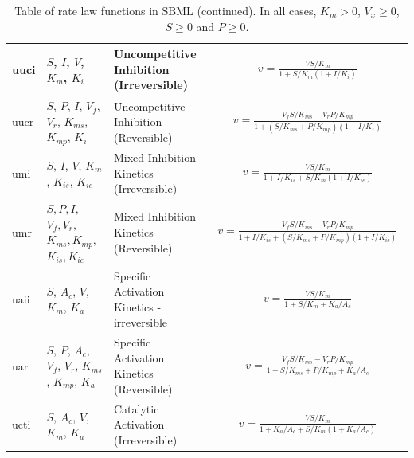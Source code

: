 \documentclass[10pt]{cekarticle}
\newcommand{\changed}[1]{\textcolor{BrickRed}{#1}}
\begin{document}
\begin{table}[ht]
\begin{tabular}{|p{0.5in}|>{\raggedright}m{0.77in}|>{\raggedright}m{1.5in}|m{3.1in}|}
uuci & $S$, $I$, $V$, $K_m$, $K_i$ & Uncompetitive Inhibition
(Irreversible) &
\begin{gather*}
v = \frac{V S/K_m}{1 + S/K_m \left( 1 + I/K_i\right)}
\end{gather*}
\\ \hline

uucr & $S$, $P$, $I$, $V_f$, $V_r$, $K_{ms}$, $K_{mp}$, $K_i$ &
Uncompetitive Inhibition (Reversible) &
\begin{gather*}
v = \frac{V_f S/K_{ms} - V_r
P/K_{mp}}{1 + \left( S/K_{ms} + P/K_{mp} \right) \left( 1 + I/K_i\right) }
\end{gather*}
\\ \hline

umi & $S$, $I$, $V$, $K_m$, $K_{is}$, $K_{ic}$ & Mixed Inhibition
Kinetics (Irreversible) &
\begin{gather*}
v = \frac{V S/K_m}{1 + I/K_{is} + S/K_m \left( 1 + I/K_{ic} \right) }
\end{gather*}
\\ \hline

umr & $ S, P, I,$ $ V_f, V_r, $ $ K_{ms}, K_{mp}, $ $ K_{is}, K_{ic} $ & Mixed
Inhibition Kinetics (Reversible) &
\begin{gather*}
v = \frac{V_f S/K_{ms} - V_r
P/K_{mp}}{1 + I/K_{is} + \left( S/K_{ms} + P/K_{mp} \right) \left( 1 + I/K_{ic}
\right) }
\end{gather*}
\\ \hline

\changed{uaii} & $S$, $A_c$, $V$, $K_m$, $K_a$ & Specific Activation Kinetics -
irreversible &
\begin{gather*}
v = \frac{V S/K_m}{1 + S/K_m + K_a/A_c}
\end{gather*}
\\ \hline

uar & $S$, $P$, $A_c$, $V_f$, $V_r$, $K_{ms}$, $K_{mp}$, $K_a$ & Specific
Activation Kinetics (Reversible) &
\begin{gather*}
v = \frac{V_f S/K_{ms} - V_r P/K_{mp}}{1 + S/K_{ms} + P/K_{mp} + K_a/A_c}
\end{gather*}
\\ \hline

ucti & $S$, $A_c$, $V$, $K_m$, $K_a$ & Catalytic Activation
(Irreversible) &
\begin{gather*}
v = \frac{V S/K_m}{1 + K_a/A_c + S/K_m \left( 1 + K_a/A_c\right)}
\end{gather*}
\\ \hline

\end{tabular}
\caption{Table of rate law functions in SBML (continued).  In all cases, $K_m > 0$, $V_x \geq 0$, $S
  \geq 0$ and $P \geq 0$.}
\end{table}
\end{document}
